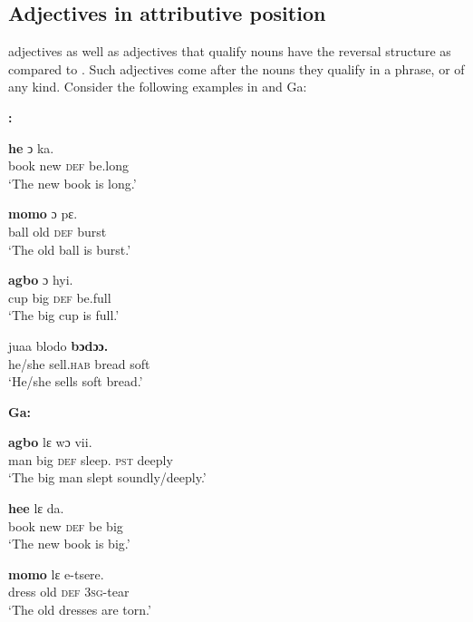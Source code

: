 \documentclass[output=paper,
modfonts
]{langscibook}
\begin{document}
\subsection{Adjectives in attributive position}\label{sec:caesar:3.1} 




 adjectives as well as  adjectives that qualify nouns have the reversal structure as compared to . Such adjectives come after the nouns they qualify in a phrase,  or of any kind. Consider the following examples in  and Ga:

\ea\label{ex:caesar:24}
\textbf{:}


 \textbf{{he}} {ↄ} {ka.}\\
book new \textsc{def} be.long\\
\glt  ‘The new book is long.’
\z



\ea\label{ex:caesar:25}
 \textbf{{momo}} {ɔ} {pɛ.}\\
 ball old \textsc{def} burst\\
\glt  ‘The old ball is burst.’
\z



\ea\label{ex:caesar:26}
 \textbf{{agbo}} {ɔ} {hyi.}\\
 cup big \textsc{def} be.full\\
\glt ‘The big cup is full.’
\z



\ea\label{ex:caesar:27}
 {juaa} {blodo} \textbf{{bɔdɔɔ.}}\\
 he/she sell.\textsc{hab} bread soft\\
\glt ‘He/she sells soft bread.’
\z

\ea\label{ex:caesar:28}
\textbf{Ga:} 

 \textbf{{agbo}}  {lɛ} {wɔ} {vii.}\\
man big \textsc{def} sleep. \textsc{pst} deeply\\
\glt ‘The big man slept soundly/deeply.’
\z

\ea\label{ex:caesar:29}
 \textbf{{hee}} {lɛ} {da.}\\
 book new \textsc{def} be big\\
\glt ‘The new book is big.’
\z



\ea\label{ex:caesar:30}
  \textbf{{momo}}  {lɛ} {e-tsere.} \\
 dress old \textsc{def} 3\textsc{sg}-tear\\
\glt  ‘The old dresses are torn.’
\z
\end{document}

